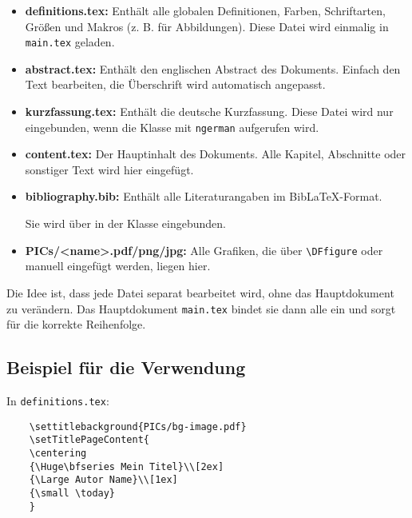 \begin{itemize}
    \item \textbf{definitions.tex:}  
    Enthält alle globalen Definitionen, Farben, Schriftarten, Größen und Makros (z. B. für Abbildungen). Diese Datei wird einmalig in \texttt{main.tex} geladen.

    \item \textbf{abstract.tex:}  
    Enthält den englischen Abstract des Dokuments. Einfach den Text bearbeiten, die Überschrift wird automatisch angepasst.

    \item \textbf{kurzfassung.tex:}  
    Enthält die deutsche Kurzfassung. Diese Datei wird nur eingebunden, wenn die Klasse mit \texttt{ngerman} aufgerufen wird.

    \item \textbf{content.tex:}  
    Der Hauptinhalt des Dokuments. Alle Kapitel, Abschnitte oder sonstiger Text wird hier eingefügt.  

    \item \textbf{bibliography.bib:}  
    Enthält alle Literaturangaben im BibLaTeX-Format. 
    
    Sie wird über \verb|| in der Klasse eingebunden.

    \item \textbf{PICs/\textless name\textgreater.pdf/png/jpg:}  
    Alle Grafiken, die über \verb|\DFfigure| oder manuell eingefügt werden, liegen hier.  
\end{itemize}

\noindent
Die Idee ist, dass jede Datei separat bearbeitet wird, ohne das Hauptdokument zu verändern. Das Hauptdokument \texttt{main.tex} bindet sie dann alle ein und sorgt für die korrekte Reihenfolge.


\clearpage

\subsection{Beispiel für die Verwendung}


In \verb|definitions.tex|:

\begin{verbatim}
    \settitlebackground{PICs/bg-image.pdf}
    \setTitlePageContent{
    \centering
    {\Huge\bfseries Mein Titel}\\[2ex]
    {\Large Autor Name}\\[1ex]
    {\small \today}
    }
\end{verbatim}

